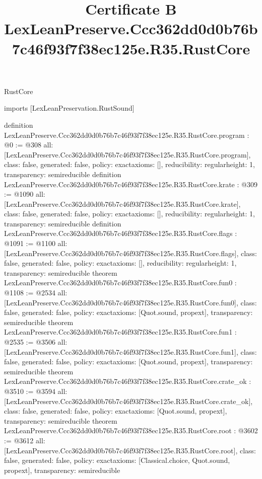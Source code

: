 \begin{lexlean}{RustCore}
\title{Certificate B LexLeanPreserve.Ccc362dd0d0b76b7c46f93f7f38ec125e.R35.RustCore}
\begin{coremodule}
imports [LexLeanPreservation.RustSound]

definition LexLeanPreserve.Ccc362dd0d0b76b7c46f93f7f38ec125e.R35.RustCore.program : @0 := @308 {
  all: [LexLeanPreserve.Ccc362dd0d0b76b7c46f93f7f38ec125e.R35.RustCore.program],
  class: false,
  generated: false,
  policy: exact{axioms: []},
  reducibility: regular{height: 1},
  transparency: semireducible
}
definition LexLeanPreserve.Ccc362dd0d0b76b7c46f93f7f38ec125e.R35.RustCore.krate : @309 := @1090 {
  all: [LexLeanPreserve.Ccc362dd0d0b76b7c46f93f7f38ec125e.R35.RustCore.krate],
  class: false,
  generated: false,
  policy: exact{axioms: []},
  reducibility: regular{height: 1},
  transparency: semireducible
}
definition LexLeanPreserve.Ccc362dd0d0b76b7c46f93f7f38ec125e.R35.RustCore.flags : @1091 := @1100 {
  all: [LexLeanPreserve.Ccc362dd0d0b76b7c46f93f7f38ec125e.R35.RustCore.flags],
  class: false,
  generated: false,
  policy: exact{axioms: []},
  reducibility: regular{height: 1},
  transparency: semireducible
}
theorem LexLeanPreserve.Ccc362dd0d0b76b7c46f93f7f38ec125e.R35.RustCore.fun0 : @1108 := @2534 {
  all: [LexLeanPreserve.Ccc362dd0d0b76b7c46f93f7f38ec125e.R35.RustCore.fun0],
  class: false,
  generated: false,
  policy: exact{axioms: [Quot.sound, propext]},
  transparency: semireducible
}
theorem LexLeanPreserve.Ccc362dd0d0b76b7c46f93f7f38ec125e.R35.RustCore.fun1 : @2535 := @3506 {
  all: [LexLeanPreserve.Ccc362dd0d0b76b7c46f93f7f38ec125e.R35.RustCore.fun1],
  class: false,
  generated: false,
  policy: exact{axioms: [Quot.sound, propext]},
  transparency: semireducible
}
theorem LexLeanPreserve.Ccc362dd0d0b76b7c46f93f7f38ec125e.R35.RustCore.crate_ok : @3510 := @3594 {
  all: [LexLeanPreserve.Ccc362dd0d0b76b7c46f93f7f38ec125e.R35.RustCore.crate_ok],
  class: false,
  generated: false,
  policy: exact{axioms: [Quot.sound, propext]},
  transparency: semireducible
}
theorem LexLeanPreserve.Ccc362dd0d0b76b7c46f93f7f38ec125e.R35.RustCore.root : @3602 := @3612 {
  all: [LexLeanPreserve.Ccc362dd0d0b76b7c46f93f7f38ec125e.R35.RustCore.root],
  class: false,
  generated: false,
  policy: exact{axioms: [Classical.choice, Quot.sound, propext]},
  transparency: semireducible
}


\end{coremodule}
\end{lexlean}
